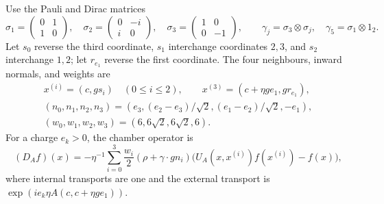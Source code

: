 Use the Pauli and Dirac matrices
\[
 \sigma_1=\begin{pmatrix}0&1\\1&0\end{pmatrix},\quad
 \sigma_2=\begin{pmatrix}0&-i\\i&0\end{pmatrix},\quad
 \sigma_3=\begin{pmatrix}1&0\\0&-1\end{pmatrix},\qquad
 \gamma_j=\sigma_3\otimes\sigma_j,\quad
 \gamma_5=\sigma_1\otimes1_2.
\]
Let \(s_0\) reverse the third coordinate, \(s_1\) interchange
coordinates \(2,3\), and \(s_2\) interchange \(1,2\); let \(r_{e_1}\)
reverse the first coordinate. The four neighbours, inward normals,
and weights are
\[
 \begin{gathered}
 x^{(i)}=(c,gs_i)\quad(0\le i\le2),\qquad
 x^{(3)}=(c+\eta ge_1,gr_{e_1}),\\
 (n_0,n_1,n_2,n_3)
   =(e_3,(e_2-e_3)/\sqrt2,(e_1-e_2)/\sqrt2,-e_1),\\
 (w_0,w_1,w_2,w_3)=(6,6\sqrt2,6\sqrt2,6).
 \end{gathered}
\]
For a charge \(e_k>0\), the chamber operator is
\begin{equation}\label{eq:intro-chamber-operator}
 (D_Af)(x)=-\eta^{-1}\sum_{i=0}^3
       \frac{w_i}{2}(\rho+\gamma\cdot gn_i)
       \bigl(U_A(x,x^{(i)})f(x^{(i)})-f(x)\bigr),
\end{equation}
where internal transports are one and the external transport is
\(\exp(ie_k\eta A(c,c+\eta ge_1))\).

